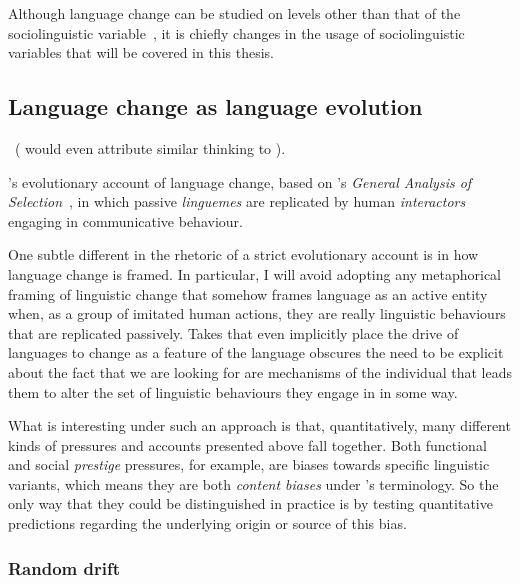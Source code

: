 Although language change can be studied on levels other than that of the sociolinguistic variable~\citep[see in particular][p.98]{Croft2006}, it is chiefly changes in the usage of sociolinguistic variables that will be covered in this thesis.



\subsection{Language change as language evolution}\label{sec:evolutionaryapproaches}

~(\citealt{Weinreich1968} would even attribute similar thinking to \citealt{Paul1920}).

\citet{Croft2000}'s evolutionary account of language change, based on \citeauthor{Hull1988}'s \emph{General Analysis of Selection}~\citeyearpar{Hull1988}, in which passive \emph{linguemes} are replicated by human \emph{interactors} engaging in communicative behaviour.

One subtle different in the rhetoric of a strict evolutionary account is in how language change is framed. In particular, I will avoid adopting any metaphorical framing of linguistic change that somehow frames language as an active entity when, as a group of imitated human actions, they are really linguistic behaviours that are replicated passively.
Takes that even implicitly place the drive of languages to change as a feature of the language obscures the need to be explicit about the fact that we are looking for are mechanisms of the individual that leads them to alter the set of linguistic behaviours they engage in in some way.

What is interesting under such an approach is that, quantitatively, many different kinds of pressures and accounts presented above fall together. Both functional and social \emph{prestige} pressures, for example, are biases towards specific linguistic variants, which means they are both \emph{content biases} under \citeauthor{Boyd1985}'s terminology. So the only way that they could be distinguished in practice is by testing quantitative predictions regarding the underlying origin or source of this bias.


\subsubsection{Random drift}



